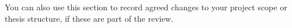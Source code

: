 \documentclass[sans,oneside,numeric,raggedright]{qreport}
\begin{document}
You can also use this section to record agreed changes to your project
scope or thesis structure, if these are part of the review.

%


%
%
\end{document}
